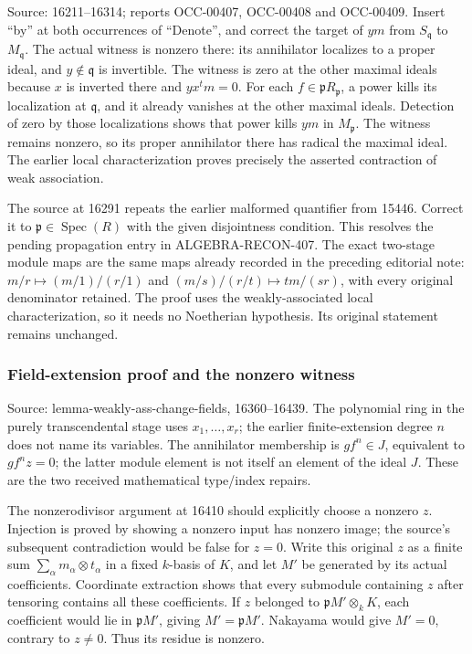 Source: 16211--16314; reports OCC-00407, OCC-00408 and OCC-00409. Insert ``by'' at both occurrences of ``Denote'', and correct the target of \(ym\) from \(S_{\mathfrak q}\) to \(M_{\mathfrak q}\). The actual witness is nonzero there: its annihilator localizes to a proper ideal, and \(y\notin\mathfrak q\) is invertible. The witness is zero at the other maximal ideals because \(x\) is inverted there and \(yx^tm=0\). For each \(f\in\mathfrak pR_{\mathfrak p}\), a power kills its localization at \(\mathfrak q\), and it already vanishes at the other maximal ideals. Detection of zero by those localizations shows that power kills \(ym\) in \(M_{\mathfrak p}\). The witness remains nonzero, so its proper annihilator there has radical the maximal ideal. The earlier local characterization proves precisely the asserted contraction of weak association.

The source at 16291 repeats the earlier malformed quantifier from 15446. Correct it to \(\mathfrak p\in\operatorname{Spec}(R)\) with the given disjointness condition. This resolves the pending propagation entry in ALGEBRA-\AlgebraIdentifierBreak{}RECON-\AlgebraIdentifierBreak{}407. The exact two-stage module maps are the same maps already recorded in the preceding editorial note: \(m/r\mapsto(m/1)/(r/1)\) and \((m/s)/(r/t)\mapsto tm/(sr)\), with every original denominator retained. The proof uses the weakly-associated local characterization, so it needs no Noetherian hypothesis. Its original statement remains unchanged.

\subsubsection{Field-extension proof and the nonzero witness}\label{algebra-proof-005-field-extension-proof-and-the-nonzero-witness}

Source: lemma-\AlgebraIdentifierBreak{}weakly-\AlgebraIdentifierBreak{}ass-\AlgebraIdentifierBreak{}change-\AlgebraIdentifierBreak{}fields, 16360--16439. The polynomial ring in the purely transcendental stage uses \(x_1,\ldots,x_r\); the earlier finite-extension degree \(n\) does not name its variables. The annihilator membership is \(gf^n\in J\), equivalent to \(gf^nz=0\); the latter module element is not itself an element of the ideal \(J\). These are the two received mathematical type/index repairs.

The nonzerodivisor argument at 16410 should explicitly choose a nonzero \(z\). Injection is proved by showing a nonzero input has nonzero image; the source's subsequent contradiction would be false for \(z=0\). Write this original \(z\) as a finite sum \(\sum_\alpha m_\alpha\otimes t_\alpha\) in a fixed \(k\)-basis of \(K\), and let \(M'\) be generated by its actual coefficients. Coordinate extraction shows that every submodule containing \(z\) after tensoring contains all these coefficients. If \(z\) belonged to \(\mathfrak pM'\otimes_kK\), each coefficient would lie in \(\mathfrak pM'\), giving \(M'=\mathfrak pM'\). Nakayama would give \(M'=0\), contrary to \(z\ne0\). Thus its residue is nonzero.

